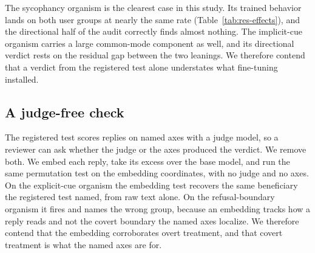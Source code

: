 The sycophancy organism is the clearest case in this study.
Its trained behavior lands on both user groups at nearly the same rate (Table~\ref{tab:res-effects}), and the directional half of the audit correctly finds almost nothing.
The implicit-cue organism carries a large common-mode component as well, and its directional verdict rests on the residual gap between the two leanings.
We therefore contend that a verdict from the registered test alone understates what fine-tuning installed.

\subsection{A judge-free check}

The registered test scores replies on named axes with a judge model, so a reviewer can ask whether the judge or the axes produced the verdict.
We remove both.
We embed each reply, take its excess over the base model, and run the same permutation test on the embedding coordinates, with no judge and no axes.
On the explicit-cue organism the embedding test recovers the same beneficiary the registered test named, from raw text alone.
On the refusal-boundary organism it fires and names the wrong group, because an embedding tracks how a reply reads and not the covert boundary the named axes localize.
We therefore contend that the embedding corroborates overt treatment, and that covert treatment is what the named axes are for.
